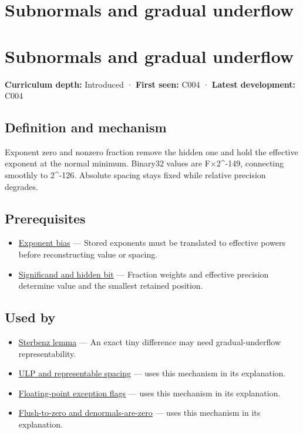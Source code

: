 \hypertarget{appendix-00a6e044c437}{}
\section*{Subnormals and gradual underflow}
\section{Subnormals and gradual underflow}\label{subnormals-and-gradual-underflow}

\textbf{Curriculum depth:} Introduced · \textbf{First seen:} C004 · \textbf{Latest development:} C004

\subsection{Definition and mechanism}\label{definition-and-mechanism}

Exponent zero and nonzero fraction remove the hidden one and hold the effective exponent at the normal minimum. Binary32 values are F×2\^{}-149, connecting smoothly to 2\^{}-126. Absolute spacing stays fixed while relative precision degrades.

\subsection{Prerequisites}\label{prerequisites}

\begin{itemize}
\tightlist
\item
  \hyperref[appendix-2fae058c82e1]{Exponent bias} --- Stored exponents must be translated to effective powers before reconstructing value or spacing.
\item
  \hyperref[appendix-a24fd710cf67]{Significand and hidden bit} --- Fraction weights and effective precision determine value and the smallest retained position.
\end{itemize}

\subsection{Used by}\label{used-by}

\begin{itemize}
\item
  \hyperref[appendix-399b7ad53f39]{Sterbenz lemma} --- An exact tiny difference may need gradual-underflow representability.
\item
  \hyperref[appendix-14bab4cab9d4]{ULP and representable spacing} --- uses this mechanism in its explanation.
\item
  \hyperref[appendix-ed8531b46754]{Floating-point exception flags} --- uses this mechanism in its explanation.
\item
  \hyperref[appendix-e979eb012782]{Flush-to-zero and denormals-are-zero} --- uses this mechanism in its explanation.
\end{itemize}

